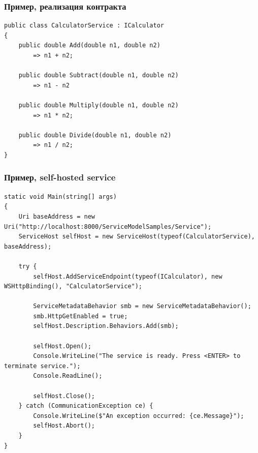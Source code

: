 \documentclass[xetex,mathserif,serif]{beamer}
\begin{document}
	\begin{frame}[fragile]
		\frametitle{Пример, реализация контракта}
		\begin{small}
			\begin{verbatim}
public class CalculatorService : ICalculator  
{
    public double Add(double n1, double n2)
        => n1 + n2;  

    public double Subtract(double n1, double n2)
        => n1 - n2

    public double Multiply(double n1, double n2)  
        => n1 * n2;

    public double Divide(double n1, double n2)  
        => n1 / n2;
}
			\end{verbatim}
		\end{small}
	\end{frame}

	\begin{frame}[fragile]
		\frametitle{Пример, self-hosted service}
		\begin{scriptsize}
			\begin{verbatim}
static void Main(string[] args) 
{
    Uri baseAddress = new Uri("http://localhost:8000/ServiceModelSamples/Service");
    ServiceHost selfHost = new ServiceHost(typeof(CalculatorService), baseAddress);

    try {
        selfHost.AddServiceEndpoint(typeof(ICalculator), new WSHttpBinding(), "CalculatorService");

        ServiceMetadataBehavior smb = new ServiceMetadataBehavior();
        smb.HttpGetEnabled = true;
        selfHost.Description.Behaviors.Add(smb);

        selfHost.Open();
        Console.WriteLine("The service is ready. Press <ENTER> to terminate service.");
        Console.ReadLine();

        selfHost.Close();  
    } catch (CommunicationException ce) {
        Console.WriteLine($"An exception occurred: {ce.Message}");
        selfHost.Abort();
    }
}
			\end{verbatim}
		\end{scriptsize}
	\end{frame}
\end{document}
